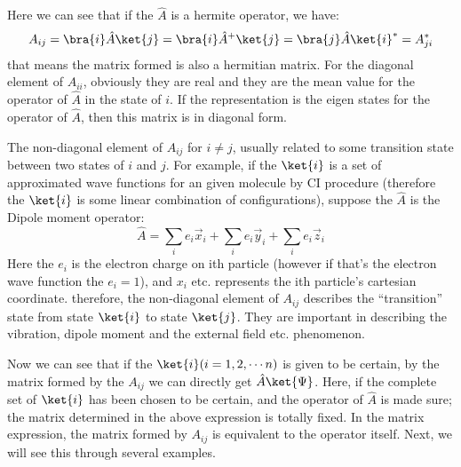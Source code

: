 Here we can see that if the $\hat{A}$ is a hermite operator, we
have:
\begin{equation}\label{REPRESENTATIONeq:6}
A_{ij} = \bra{i}\hat{A}\ket{j} = \bra{i}\hat{A}^{+}\ket{j} =
\bra{j}\hat{A}\ket{i}^{*} = A_{ji}^{*}
\end{equation}
that means the matrix formed is also a hermitian matrix. For the
diagonal element of $A_{ii}$, obviously they are real and they are
the mean value for the operator of $\hat{A}$ in the state of $i$. If
the representation is the eigen states for the operator of
$\hat{A}$, then this matrix is in diagonal form.

The non-diagonal element of $A_{ij}$ for $i\neq j$, usually related
to some transition state between two states of $i$ and $j$. For
example, if the $\ket{i}$ is a set of approximated wave functions
for an given molecule by CI procedure (therefore the $\ket{i}$ is
some linear combination of configurations), suppose the $\hat{A}$ is
the Dipole moment operator:
\begin{equation}\label{}
\hat{A} = \sum_{i}e_{i}\overrightarrow{x}_{i} +
\sum_{i}e_{i}\overrightarrow{y}_{i} +
\sum_{i}e_{i}\overrightarrow{z}_{i}
\end{equation}
Here the $e_{i}$ is the electron charge on ith particle (however if
that's the electron wave function the $e_{i} = 1$), and $x_{i}$ etc.
represents the ith particle's cartesian coordinate. therefore, the
non-diagonal element of $A_{ij}$ describes the ``transition'' state
from state $\ket{i}$ to state $\ket{j}$. They are important in
describing the vibration, dipole moment and the external field etc.
phenomenon.

Now we can see that if the $\ket{i} (i=1,2, \cdots n)$ is given to
be certain, by the matrix formed by the $A_{ij}$ we can directly get
$\hat{A}\ket{\Psi}$. Here, if the complete set of $\ket{i}$ has been
chosen to be certain, and the operator of $\hat{A}$ is made sure;
the matrix determined in the above expression is totally fixed. In
the matrix expression, the matrix formed by $A_{ij}$ is equivalent
to the operator itself. Next, we will see this through several
examples.

